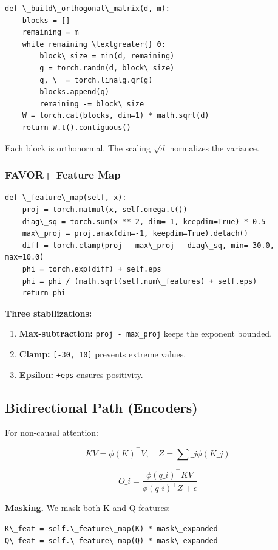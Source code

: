 \begin{lstlisting}
def \_build\_orthogonal\_matrix(d, m):
    blocks = []
    remaining = m
    while remaining \textgreater{} 0:
        block\_size = min(d, remaining)
        g = torch.randn(d, block\_size)
        q, \_ = torch.linalg.qr(g)
        blocks.append(q)
        remaining -= block\_size
    W = torch.cat(blocks, dim=1) * math.sqrt(d)
    return W.t().contiguous()
\end{lstlisting}

Each block is orthonormal. The scaling $\sqrt{d}$ normalizes the variance.

\subsubsection{FAVOR+ Feature Map}

\begin{lstlisting}
def \_feature\_map(self, x):
    proj = torch.matmul(x, self.omega.t())
    diag\_sq = torch.sum(x ** 2, dim=-1, keepdim=True) * 0.5
    max\_proj = proj.amax(dim=-1, keepdim=True).detach()
    diff = torch.clamp(proj - max\_proj - diag\_sq, min=-30.0, max=10.0)
    phi = torch.exp(diff) + self.eps
    phi = phi / (math.sqrt(self.num\_features) + self.eps)
    return phi
\end{lstlisting}

\textbf{Three stabilizations:}
\begin{enumerate}
\item \textbf{Max-subtraction:} \texttt{proj - max\_proj} keeps the exponent bounded.
\item \textbf{Clamp:} \texttt{[-30, 10]} prevents extreme values.
\item \textbf{Epsilon:} \texttt{+eps} ensures positivity.

\end{enumerate}
\subsection{Bidirectional Path (Encoders)}

For non-causal attention:

\[
KV = \phi(K)^\top V, \quad Z = \sum\_j \phi(K\_j)
\tag{4.1}
\]

\[
O\_i = \frac{\phi(q\_i)^\top KV}{\phi(q\_i)^\top Z + \epsilon}
\tag{4.2}
\]

\textbf{Masking.} We mask both K and Q features:

\begin{lstlisting}
K\_feat = self.\_feature\_map(K) * mask\_expanded
Q\_feat = self.\_feature\_map(Q) * mask\_expanded
\end{lstlisting}

